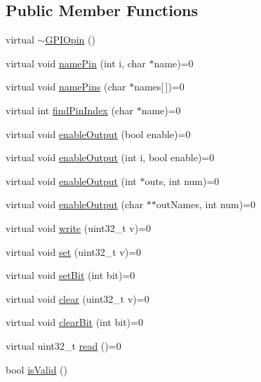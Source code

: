 \subsection*{Public Member Functions}
\begin{DoxyCompactItemize}
\item 
virtual \hyperlink{class_g_p_i_opin_a28e3ff135999c7bfe6f9ebb6b2c8512e}{$\sim$\-G\-P\-I\-Opin} ()
\item 
virtual void \hyperlink{class_g_p_i_opin_a3feb6f38bd934e63d0704c9e178b443e}{name\-Pin} (int i, char $\ast$name)=0
\item 
virtual void \hyperlink{class_g_p_i_opin_a6d11afb8376b7ea7c5f7996fc364f64a}{name\-Pins} (char $\ast$names\mbox{[}$\,$\mbox{]})=0
\item 
virtual int \hyperlink{class_g_p_i_opin_a52fd993a558bc7dacd6b5c9060dd610f}{find\-Pin\-Index} (char $\ast$name)=0
\item 
virtual void \hyperlink{class_g_p_i_opin_a444117958e6fb28524deeefefe75c13b}{enable\-Output} (bool enable)=0
\item 
virtual void \hyperlink{class_g_p_i_opin_a832df9e2b1d14f8434069d952d372d6d}{enable\-Output} (int i, bool enable)=0
\item 
virtual void \hyperlink{class_g_p_i_opin_a4e1d95ff89bb7a2b60870c318f3740a5}{enable\-Output} (int $\ast$outs, int num)=0
\item 
virtual void \hyperlink{class_g_p_i_opin_a3ce477ef4fcfced2764c489d5262ee81}{enable\-Output} (char $\ast$$\ast$out\-Names, int num)=0
\item 
virtual void \hyperlink{class_g_p_i_opin_a5dd506e32835b1e35edf62649f3beaa6}{write} (uint32\-\_\-t v)=0
\item 
virtual void \hyperlink{class_g_p_i_opin_a75314dc1bf78be651b660a1b8df5537a}{set} (uint32\-\_\-t v)=0
\item 
virtual void \hyperlink{class_g_p_i_opin_a7baef314398bbff5261b41e3373e68c8}{set\-Bit} (int bit)=0
\item 
virtual void \hyperlink{class_g_p_i_opin_abc101fb598fa749ae58743e8b2decbbc}{clear} (uint32\-\_\-t v)=0
\item 
virtual void \hyperlink{class_g_p_i_opin_a7b79f39cb611f1b1e0a95c3a35dbc94b}{clear\-Bit} (int bit)=0
\item 
virtual uint32\-\_\-t \hyperlink{class_g_p_i_opin_ac1a7a08dfd7828fc6f4384f390b75c0e}{read} ()=0
\item 
bool \hyperlink{class_g_p_i_opin_aa6bfbc72b6c3d58b0e01f3fec428b1b1}{is\-Valid} ()
\end{DoxyCompactItemize}

